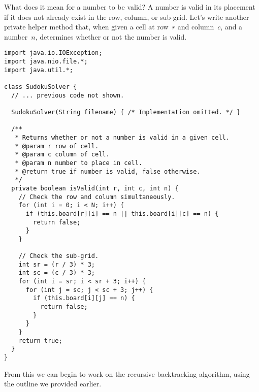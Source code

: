 What does it mean for a number to be valid? 
A number is valid in its placement if it does not already exist in the row, column, or sub-grid. 
Let's write another private helper method that, when given a cell at row~$r$ and column~$c$, and a number~$n$, determines whether or not the number is valid.

\begin{lstlisting}[language=MyJava]
import java.io.IOException;
import java.nio.file.*;
import java.util.*;

class SudokuSolver {
  // ... previous code not shown.

  SudokuSolver(String filename) { /* Implementation omitted. */ }

  /**
   * Returns whether or not a number is valid in a given cell.
   * @param r row of cell.
   * @param c column of cell.
   * @param n number to place in cell.
   * @return true if number is valid, false otherwise.
   */ 
  private boolean isValid(int r, int c, int n) {
    // Check the row and column simultaneously.
    for (int i = 0; i < N; i++) {
      if (this.board[r][i] == n || this.board[i][c] == n) { 
        return false; 
      }
    }

    // Check the sub-grid.
    int sr = (r / 3) * 3;
    int sc = (c / 3) * 3;
    for (int i = sr; i < sr + 3; i++) {
      for (int j = sc; j < sc + 3; j++) {
        if (this.board[i][j] == n) { 
          return false; 
        }
      }
    }
    return true;
  }
}
\end{lstlisting}

From this we can begin to work on the recursive backtracking algorithm, using the outline we provided earlier. 

